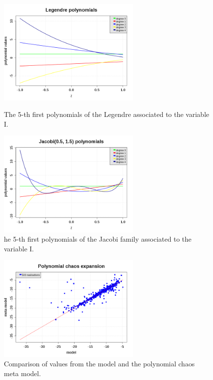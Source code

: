 \begin{figure}[H]
  \begin{minipage}{9cm}
    \begin{center}
      \includegraphics[width=7cm]{PCE_LegendrePolynomials_VariableL.png}
      \caption{The 5-th first polynomials of the Legendre associated to the variable I.}
      \label{PCE_L}
    \end{center}
  \end{minipage}
  \hfill
  \begin{minipage}{9cm}
    \begin{center}
      \includegraphics[width=7cm]{PCE_JacobiPolynomials_VariableI.png}
      \caption{he 5-th first polynomials of the Jacobi family associated to the variable I.}
      \label{PCE_I}
    \end{center}
  \end{minipage}
\end{figure}




\begin{figure}[H]
  \begin{center}
    \includegraphics[width=7cm]{PCE_comparisonModels.png}
    \caption{Comparison of values from the model and the polynomial chaos meta model.}
    \label{ModelsComparison}
  \end{center}
\end{figure}


